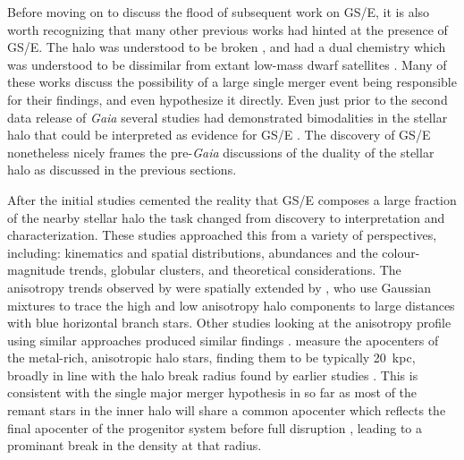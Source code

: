 Before moving on to discuss the flood of subsequent work on GS/E, it is also worth recognizing that many other previous works had hinted at the presence of GS/E. The halo was understood to be broken \parencite{deason11,sesar11}, and had a dual chemistry \parencite{carollo07,nissen10} which was understood to be dissimilar from extant low-mass dwarf satellites \parencite{venn04}. Many of these works discuss the possibility of a large single merger event being responsible for their findings, and \textcite{deason13} even hypothesize it directly. Even just prior to the second data release of \textit{Gaia} several studies had demonstrated bimodalities in the stellar halo that could be interpreted as evidence for GS/E \parencite{bonaca17,deason17,hayes18}. The discovery of GS/E nonetheless nicely frames the pre-\textit{Gaia} discussions of the duality of the stellar halo as discussed in the previous sections.

After the initial studies cemented the reality that GS/E composes a large fraction of the nearby stellar halo the task changed from discovery to interpretation and characterization. These studies approached this from a variety of perspectives, including: kinematics and spatial distributions, abundances and the colour-magnitude trends, globular clusters, and theoretical considerations. The anisotropy trends observed by \textcite{belokurov18} were spatially extended by \textcite{lancaster19}, who use Gaussian mixtures to trace the high and low anisotropy halo components to large distances with blue horizontal branch stars. Other studies looking at the anisotropy profile using similar approaches produced similar findings \parencite{necib19,bird19}. \textcite{deason18} measure the apocenters of the metal-rich, anisotropic halo stars, finding them to be typically 20~kpc, broadly in line with the halo break radius found by earlier studies \parencite[e.g.][]{deason11,sesar11,xue15}. This is consistent with the single major merger hypothesis in so far as most of the remant stars in the inner halo will share a common apocenter which reflects the final apocenter of the progenitor system before full disruption \parencite[indeed, this was the driver for the hypothesis of][]{deason13}, leading to a prominant break in the density at that radius. 


